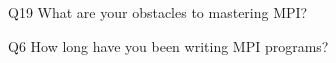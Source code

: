 \begin{description}%
\item{Q19} What are your obstacles to mastering MPI?%
\item{Q6} How long have you been writing MPI programs?%
\end{description}%

